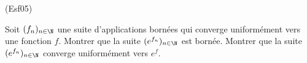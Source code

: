 \begin{tiny}(Esf05)\end{tiny} Soit $(f_n)_{n\in\N}$ une suite d'applications born{\'e}es qui converge uniform{\'e}ment vers une fonction $f$.  Montrer que la suite $(e^{f_n})_{n\in\N}$ est born{\'e}e. Montrer que la suite $(e^{f_n})_{n\in\N}$ converge uniform{\'e}ment vers $e^f$.